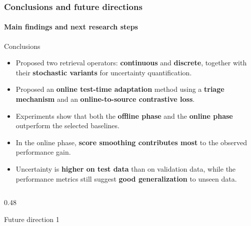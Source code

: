\documentclass[aspectratio=169]{beamer}
\begin{document}
\begin{frame}
    \frametitle{Conclusions and future directions}
    \framesubtitle{Main findings and next research steps}

    \begin{block}{Conclusions}
        \scriptsize
        \vspace{-0.35em}

        \begin{itemize}
            \setlength{\itemsep}{0.15em}

            \item Proposed two retrieval operators:
            \textbf{continuous} and \textbf{discrete},
            together with their \textbf{stochastic variants}
            for uncertainty quantification.

            \item Proposed an \textbf{online test-time adaptation} method
            using a \textbf{triage mechanism} and an
            \textbf{online-to-source contrastive loss}.

            \item Experiments show that both the
            \textbf{offline phase} and the
            \textbf{online phase}
            outperform the selected baselines.

            \item In the online phase,
            \textbf{score smoothing contributes most}
            to the observed performance gain.

            \item Uncertainty is \textbf{higher on test data}
            than on validation data, while the performance metrics still suggest
            \textbf{good generalization} to unseen data.
        \end{itemize}

        \vspace{-0.35em}
    \end{block}

    \vspace{-0.5em}

    \begin{columns}[T,onlytextwidth]

        \begin{column}{0.48\textwidth}
            \begin{exampleblock}{Future direction 1}
                \scriptsize
                \vspace{-0.35em}


\end{exampleblock}
\end{column}
\end{columns}
\end{frame}
\end{document}
